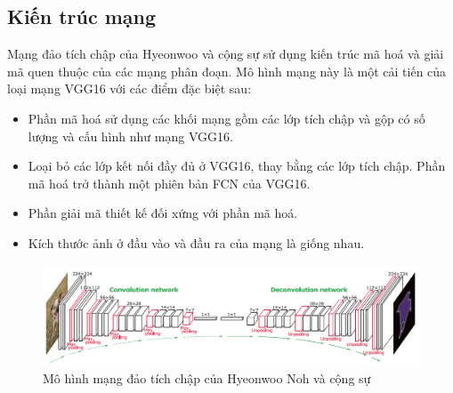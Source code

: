 \subsection{Kiến trúc mạng}
Mạng đảo tích chập của Hyeonwoo và cộng sự sử dụng kiến trúc mã hoá và giải mã quen thuộc của các mạng phân đoạn. Mô hình mạng này là một cải tiến của loại mạng VGG16 với các điểm đặc biệt sau:
\begin{itemize}
    \item Phần mã hoá sử dụng các khối mạng gồm các lớp tích chập và gộp có số lượng và cấu hình như mạng VGG16. 
    \item Loại bỏ các lớp kết nối đầy đủ ở VGG16, thay bằng các lớp tích chập. Phần mã hoá trở thành một phiên bản FCN của VGG16.
    \item Phần giải mã thiết kế đối xứng với phần mã hoá.
    \item Kích thước ảnh ở đầu vào và đầu ra của mạng là giống nhau.
\end{itemize}
\begin{figure}[h]
\centering
    \includegraphics[totalheight=4cm]{Images/deconvNet.png}
    \caption{Mô hình mạng đảo tích chập của Hyeonwoo Noh và cộng sự}
    \label{deconvNet}
\end{figure}

